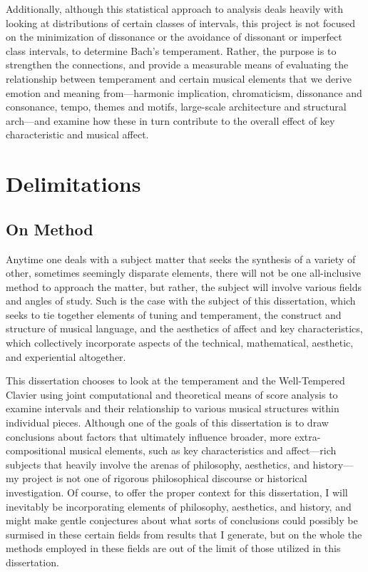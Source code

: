 Additionally, although this statistical approach to analysis deals
heavily with looking at distributions of certain classes of intervals,
this project is not focused on the minimization of dissonance or the
avoidance of dissonant or imperfect class intervals, to determine Bach's
temperament. Rather, the purpose is to strengthen the connections, and
provide a measurable means of evaluating the relationship between
temperament and certain musical elements that we derive emotion and
meaning from---harmonic implication, chromaticism, dissonance and
consonance, tempo, themes and motifs, large-scale architecture and
structural arch---and examine how these in turn contribute to the
overall effect of key characteristic and musical affect.

    \section{Delimitations}\label{delimitations}

\subsection{On Method}\label{on-method}

Anytime one deals with a subject matter that seeks the synthesis of a
variety of other, sometimes seemingly disparate elements, there will not
be one all-inclusive method to approach the matter, but rather, the
subject will involve various fields and angles of study. Such is the
case with the subject of this dissertation, which seeks to tie together
elements of tuning and temperament, the construct and structure of
musical language, and the aesthetics of affect and key characteristics,
which collectively incorporate aspects of the technical, mathematical,
aesthetic, and experiential altogether.

This dissertation chooses to look at the temperament and the
Well-Tempered Clavier using joint computational and theoretical means of
score analysis to examine intervals and their relationship to various
musical structures within individual pieces. Although one of the goals
of this dissertation is to draw conclusions about factors that
ultimately influence broader, more extra-compositional musical elements,
such as key characteristics and affect---rich subjects that heavily
involve the arenas of philosophy, aesthetics, and history---my project
is not one of rigorous philosophical discourse or historical
investigation. Of course, to offer the proper context for this
dissertation, I will inevitably be incorporating elements of philosophy,
aesthetics, and history, and might make gentle conjectures about what
sorts of conclusions could possibly be surmised in these certain fields
from results that I generate, but on the whole the methods employed in
these fields are out of the limit of those utilized in this
dissertation.

